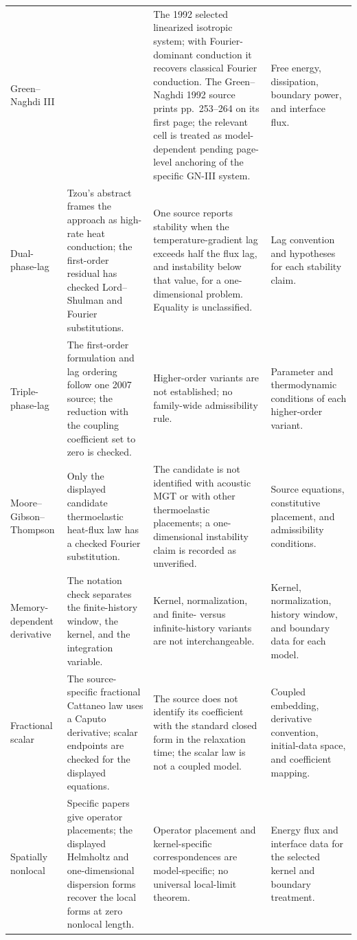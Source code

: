 \begin{longtable}{@{}>{\raggedright\arraybackslash}p{2.6cm}>{\raggedright\arraybackslash}p{3.9cm}>{\raggedright\arraybackslash}p{3.9cm}>{\raggedright\arraybackslash}p{3.9cm}@{}}
Green--Naghdi III & & The 1992 selected linearized isotropic system; with Fourier-dominant conduction it recovers classical Fourier conduction. The Green--Naghdi 1992 source prints pp.~253--264 on its first page; the relevant cell is treated as model-dependent pending page-level anchoring of the specific GN-III system. & Free energy, dissipation, boundary power, and interface flux. \\
Dual-phase-lag & Tzou's abstract frames the approach as high-rate heat conduction; the first-order residual has checked Lord--Shulman and Fourier substitutions. & One source reports stability when the temperature-gradient lag exceeds half the flux lag, and instability below that value, for a one-dimensional problem. Equality is unclassified. & Lag convention and hypotheses for each stability claim. \\
Triple-phase-lag & The first-order formulation and lag ordering follow one 2007 source; the reduction with the coupling coefficient set to zero is checked. & Higher-order variants are not established; no family-wide admissibility rule. & Parameter and thermodynamic conditions of each higher-order variant. \\
Moore--Gibson--Thompson & Only the displayed candidate thermoelastic heat-flux law has a checked Fourier substitution. & The candidate is not identified with acoustic MGT or with other thermoelastic placements; a one-dimensional instability claim is recorded as unverified. & Source equations, constitutive placement, and admissibility conditions. \\
Memory-dependent derivative & The notation check separates the finite-history window, the kernel, and the integration variable. & Kernel, normalization, and finite- versus infinite-history variants are not interchangeable. & Kernel, normalization, history window, and boundary data for each model. \\
Fractional scalar & The source-specific fractional Cattaneo law uses a Caputo derivative; scalar endpoints are checked for the displayed equations. & The source does not identify its coefficient with the standard closed form in the relaxation time; the scalar law is not a coupled model. & Coupled embedding, derivative convention, initial-data space, and coefficient mapping. \\
Spatially nonlocal & Specific papers give operator placements; the displayed Helmholtz and one-dimensional dispersion forms recover the local forms at zero nonlocal length. & Operator placement and kernel-specific correspondences are model-specific; no universal local-limit theorem. & Energy flux and interface data for the selected kernel and boundary treatment. \\

\end{longtable}

